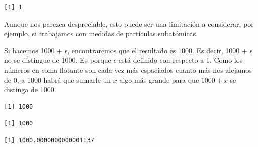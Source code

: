 \documentclass[openany]{book}
\newenvironment{Shaded}{\begin{snugshade}}{\end{snugshade}}
\newcommand{\DataTypeTok}[1]{\textcolor[rgb]{0.13,0.29,0.53}{#1}}
\newcommand{\DecValTok}[1]{\textcolor[rgb]{0.00,0.00,0.81}{#1}}
\newcommand{\KeywordTok}[1]{\textcolor[rgb]{0.13,0.29,0.53}{\textbf{#1}}}
\newcommand{\NormalTok}[1]{#1}
\newcommand{\OperatorTok}[1]{\textcolor[rgb]{0.81,0.36,0.00}{\textbf{#1}}}
\newcommand{\StringTok}[1]{\textcolor[rgb]{0.31,0.60,0.02}{#1}}
\begin{document}
\begin{verbatim}
[1] 1
\end{verbatim}

Aunque nos parezca despreciable, esto puede ser una limitación a considerar, por ejemplo, si trabajamos con medidas de partículas subatómicas.

Si hacemos 1000 + \(\epsilon\), encontraremos que el resultado es 1000. Es decir, 1000 + \(\epsilon\) no se distingue de 1000. Es porque \(\epsilon\) está definido con respecto a 1. Como los números en coma flotante son cada vez más espaciados cuanto más nos alejamos de 0, a 1000 habrá que sumarle un \(x\) algo más grande para que \(1000 + x\) se distinga de 1000.

\begin{Shaded}
\end{Shaded}

\begin{verbatim}
[1] 1000
\end{verbatim}

\begin{Shaded}
\end{Shaded}

\begin{verbatim}
[1] 1000
\end{verbatim}

\begin{Shaded}
\end{Shaded}

\begin{verbatim}
[1] 1000.0000000000001137
\end{verbatim}
\end{document}
